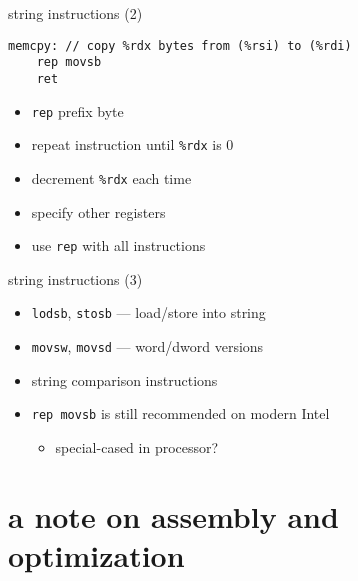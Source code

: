 \begin{frame}[fragile,label=string2]{string instructions (2)}
\begin{lstlisting}[style=small]
memcpy: // copy %rdx bytes from (%rsi) to (%rdi)
    rep movsb
    ret
\end{lstlisting}
\begin{itemize}
\item {\tt rep} prefix byte
\vspace{.5cm}
\item repeat instruction until {\tt \%rdx} is 0
\item decrement {\tt \%rdx} each time
\item {} specify other registers
\item {} use {\tt rep} with all instructions
\end{itemize}
\end{frame}

\begin{frame}{string instructions (3)}
\begin{itemize}
\item {\tt lodsb}, {\tt stosb} --- load/store into string
\item {\tt movsw}, {\tt movsd} --- word/dword versions
\item string comparison instructions
\vspace{.5cm}
\item {\tt rep movsb} is still recommended on modern Intel
    \begin{itemize}
    \item special-cased in processor?
    \end{itemize}
\end{itemize}
\end{frame}


\section{a note on assembly and optimization}

